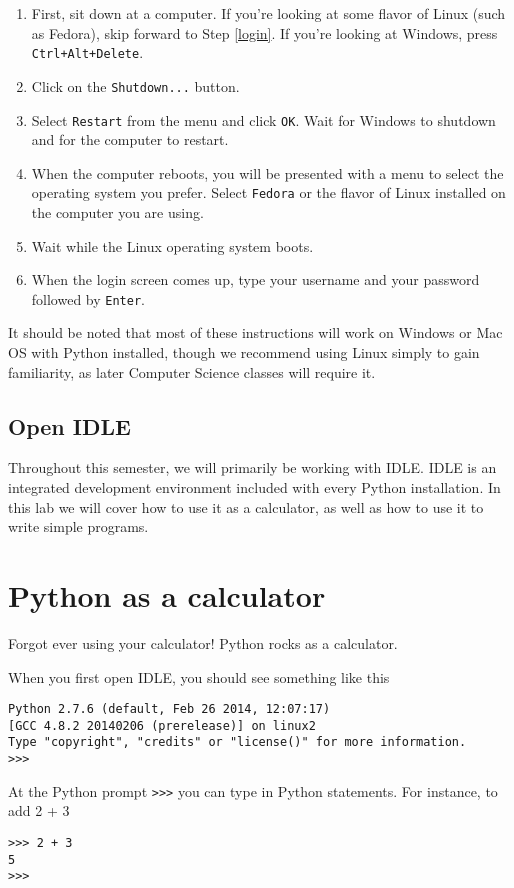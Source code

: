 \documentclass[12pt]{article}
\begin{document}
\begin{enumerate}
\item First, sit down at a computer. If you're looking at some flavor of Linux (such as Fedora), skip forward to Step \ref{login}. If you're looking at Windows, press \texttt{Ctrl+Alt+Delete}.
\item Click on the \texttt{Shutdown...} button.
\item Select \texttt{Restart} from the menu and click \texttt{OK}. Wait for Windows to shutdown and for the computer to restart.
\item When the computer reboots, you will be presented with a menu to select the operating system you prefer. Select \texttt{Fedora} or the flavor of Linux installed on the computer you are using.
\item Wait while the Linux operating system boots.
\item \label{login} When the login screen comes up, type your username and your password followed by \texttt{Enter}.
\end{enumerate}

It should be noted that most of these instructions will work on Windows or Mac OS with Python installed, though we recommend using Linux simply to gain familiarity, as later Computer Science classes will require it.

\subsection{Open IDLE}
Throughout this semester, we will primarily be working with IDLE. IDLE is an integrated development environment included with every Python installation. In this lab we will cover how to use it as a calculator, as well as how to use it to write simple programs.

\section{Python as a calculator}
Forgot ever using your calculator! Python rocks as a calculator.

When you first open IDLE, you should see something like this
\begin{lstlisting}[style=bash]
Python 2.7.6 (default, Feb 26 2014, 12:07:17) 
[GCC 4.8.2 20140206 (prerelease)] on linux2
Type "copyright", "credits" or "license()" for more information.
>>> 
\end{lstlisting}

At the Python prompt \texttt{>>>} you can type in Python statements. For instance, to add 2 + 3 
\begin{lstlisting}[style=bash]
>>> 2 + 3
5
>>>
\end{lstlisting}
\end{document}

